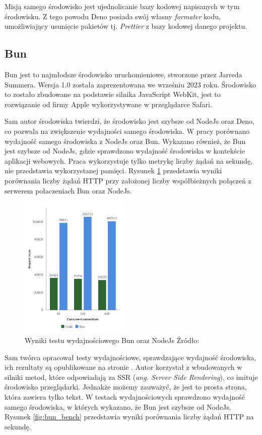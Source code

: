 Misją samego środowisko jest ujednolicanie bazy kodowej napisanych w tym środowisku. Z tego powodu Deno posiada swój własny \textit{formater} kodu, umożliwiający usunięcie pakietów tj. \textit{Prettier} \cite{prettier} z bazy kodowej danego projektu. 

\subsection{Bun}
Bun \cite{bun} jest to najmłodsze środowisko uruchomieniowe, stworzone przez Jarreda Summera. Wersja 1.0 została zaprezentowana we wrześniu 2023 roku. Środowisko to zostało zbudowane na podstawie silnika JavaScript WebKit, jest to rozwiązanie od firmy Apple wykorzystywane w przeglądarce Safari.

Sam autor środowiska twierdzi, że środowisko jest szybsze od NodeJs oraz Deno, co pozwala na zwiększenie wydajności samego środowiska. W pracy \cite{NodeAndBun} porównano wydajność samego środowiska z NodeJs oraz Bun. Wykazano również, że Bun jest szybsze od NodeJs, gdzie sprawdzono wydajność środowiska w kontekście aplikacji webowych. Praca wykorzystuje tylko metrykę liczby żądań na sekundę, nie przedstawia wykorzystanej pamięci. Rysunek \ref{fig:bun_vs_node} przedstawia wyniki porównania liczby żądań HTTP przy założonej liczby współbieżnych połączeń z serwerem połaczeniach Bun oraz NodeJs.

\begin{figure}[H]
  \centering
  \includegraphics[width=0.47\textwidth]{Figures/bun_bench_node.png}
  \caption{Wyniki testu wydajnościowego Bun oraz NodeJs Źródło:\cite{bun_test}}
  \label{fig:bun_vs_node}
\end{figure}

Sam twórca opracował testy wydajnościowe, sprawdzające wydajność środowiska, ich rezultaty są opublikowane na stronie \cite{bun_test}. Autor korzystał z wbudowanych w silniki metod, które odpowiadają za SSR (\textit{ang. Server Side Rendering}), co imituje środowisko przeglądarki. Jednakże możemy zauważyć, że jest to prosta strona, która zawiera tylko tekst. W testach wydajnościowych sprawdzono wydajność samego środowiska, w których wykazano, że Bun jest szybsze od NodeJs. Rysunek \ref{fig:bun_bench} przedstawia wyniki porównania liczby żądań HTTP na sekundę.

